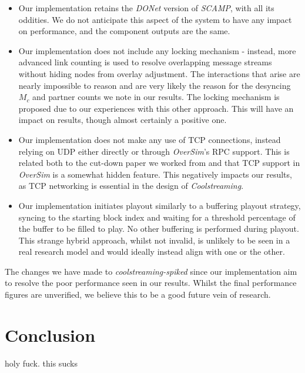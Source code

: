 \documentclass[12pt,a4paper]{article}
\begin{document}
\begin{itemize}
	\item Our implementation retains the \textit{DONet} version of \textit{SCAMP}, with all its oddities. We do not anticipate this aspect of the system to have any impact on performance, and the component outputs are the same.
	\item Our implementation does not include any locking mechanism - instead, more advanced link counting is used to resolve overlapping message streams without hiding nodes from overlay adjustment. The interactions that arise are nearly impossible to reason and are very likely the reason for the desyncing \(M_c\) and partner counts we note in our results. The locking mechanism is proposed due to our experiences with this other approach. This will have an impact on results, though almost certainly a positive one.
	\item Our implementation does not make any use of TCP connections, instead relying on UDP either directly or through \textit{OverSim}'s RPC support. This is related both to the cut-down paper we worked from and that TCP support in \textit{OverSim} is a somewhat hidden feature. This negatively impacts our results, as TCP networking is essential in the design of \textit{Coolstreaming}.
	\item Our implementation initiates playout similarly to a buffering playout strategy, syncing to the starting block index and waiting for a threshold percentage of the buffer to be filled to play. No other buffering is performed during playout. This strange hybrid approach, whilst not invalid, is unlikely to be seen in a real research model and would ideally instead align with one or the other.
\end{itemize}

The changes we have made to \textit{coolstreaming-spiked} since our implementation aim to resolve the poor performance seen in our results. Whilst the final performance figures are unverified, we believe this to be a good future vein of research.

\section{Conclusion} \label{conclusion}
holy fuck. this sucks

\printbibliography
\end{document}
